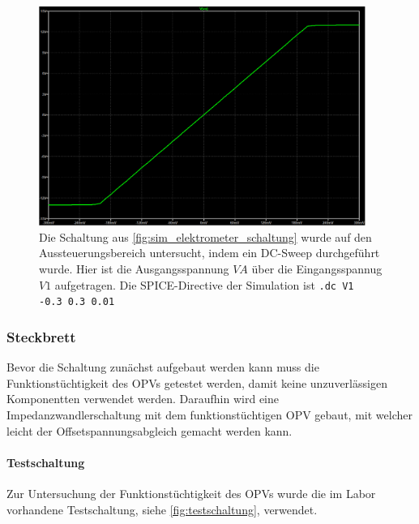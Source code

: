 \documentclass[12pt,english,ngerman]{scrartcl}
\begin{document}
\begin{figure}[H]
  \centering
    \includegraphics[width=0.95\textwidth]{./figures/elektrometer/sim/aus_sweep.png}
  \caption{Die Schaltung aus \autoref{fig:sim_elektrometer_schaltung} wurde auf
    den Aussteuerungsbereich untersucht, indem ein DC-Sweep durchgeführt wurde.
    Hier ist die Ausgangsspannung $VA$ über die Eingangsspannug $V1$
    aufgetragen. Die SPICE-Directive der Simulation ist \texttt{.dc V1 -0.3 0.3 0.01}}
  \label{fig:sim_elektrometer_dcsweep}
\end{figure}

\subsubsection{Steckbrett} \label{sec:elektrometer_steckbrett}
Bevor die Schaltung zunächst aufgebaut werden kann muss die
Funktionstüchtigkeit des OPVs getestet werden, damit keine unzuverlässigen
Komponentten verwendet werden. Daraufhin wird eine Impedanzwandlerschaltung mit
dem funktionstüchtigen OPV gebaut, mit welcher leicht der
Offsetspannungsabgleich gemacht werden kann.


\paragraph{Testschaltung}
Zur Untersuchung der Funktionstüchtigkeit des OPVs wurde die im Labor vorhandene
Testschaltung, siehe \autoref{fig:testschaltung}, verwendet. 
\end{document}
